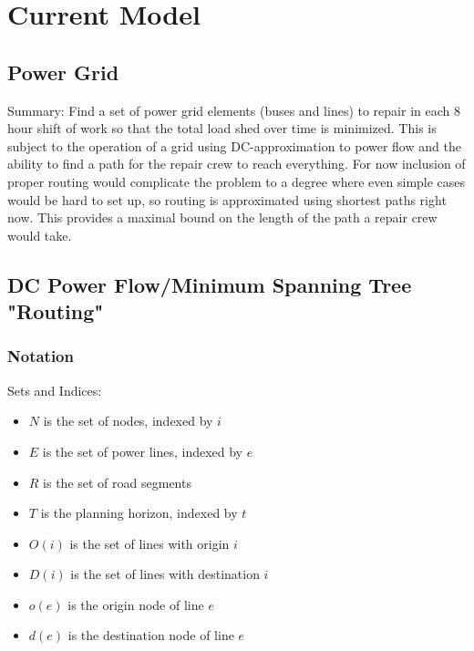 \documentclass{article}
\begin{document}
	
	\section{Current Model}
	\subsection{Power Grid}
	Summary: Find a set of power grid elements (buses and lines) to repair in each 8 hour shift of work so that the total load shed over time is minimized. This is subject to the operation of a grid using DC-approximation to power flow and the ability to find a path for the repair crew to reach everything. For now inclusion of proper routing would complicate the problem to a degree where even simple cases would be hard to set up, so routing is approximated using shortest paths right now. This provides a maximal bound on the length of the path a repair crew would take. 
	
	\subsection{DC Power Flow/Minimum Spanning Tree "Routing"}	

	\subsubsection{Notation}
Sets and Indices:
	\begin{itemize}
		\item $N$ is the set of nodes, indexed by $i$
		\item $E$ is the set of power lines, indexed by $e$
		\item $R$ is the set of road segments
		\item $T$ is the planning horizon, indexed by $t$
		\item $O(i)$ is the set of lines with origin $i$
		\item $D(i)$ is the set of lines with destination $i$
		\item $o(e)$ is the origin node of line $e$
		\item $d(e)$ is the destination node of line $e$
	\end{itemize}
\end{document}
